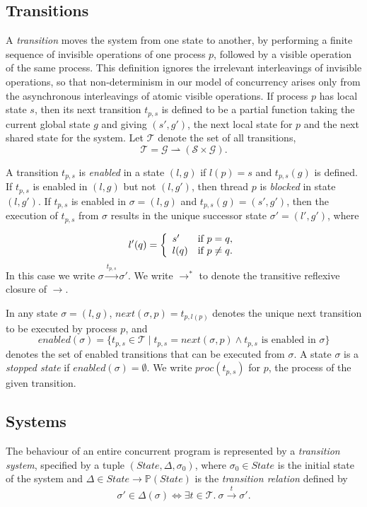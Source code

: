 \documentclass[12pt,a4paper,twoside,openany]{report}
\begin{document}
\subsection{Transitions}
\label{sec:trans-prep}
A \emph{transition} moves the system from one state to another,
by performing a finite sequence of invisible operations of one
process $p$, followed by a visible operation of the same
process. This definition ignores the irrelevant
interleavings of invisible operations, so that
non-determinism in our model of concurrency
arises only from the asynchronous interleavings of
atomic visible operations.
If process $p$ has local state $s$, then its next transition $t_{p,s}$
is defined to be a partial function taking the current
global state $g$ and giving $(s', g')$, the next local state for $p$
and the next shared state for the system. Let $\mathcal{T}$ denote the
set of all transitions,
	\[\mathcal{T} = \mathcal{G} \rightharpoonup
				(\mathcal{S} \times \mathcal{G}).\]

A transition $t_{p,s}$ is \emph{enabled} in a state
$(l, g)$ if $l(p) = s$ and $t_{p,s}(g)$ is defined.
If $t_{p,s}$ is enabled in $(l, g)$ but not $(l, g')$,
then thread $p$ is \emph{blocked} in
state $(l, g')$.
If $t_{p,s}$ is enabled in $\sigma = (l, g)$ and 
$t_{p,s}(g) = (s', g')$, then the
execution of $t_{p,s}$ from $\sigma$ results in the unique successor
state $\sigma' = (l', g')$, where

\[
	l'(q) = \left\{\begin{array}{lr}
				s' & \textmd{if } p = q, \\
				l(q) &\textmd{if } p \neq q.
			\end{array} \right.
\]
In this case we write $\sigma \xrightarrow{t_{p,s}} \sigma'$.
We write $\longrightarrow^*$ to denote the transitive reflexive
closure of $\longrightarrow$.

In any state $\sigma = (l, g)$,
$\textit{next}(\sigma, p) = t_{p,l(p)}$ denotes the unique next transition
to be executed by process $p$, and
\[
	\textit{enabled}(\sigma) = \{t_{p,s} \in \mathcal{T} \mid
	t_{p,s} = \textit{next}(\sigma, p)
	\wedge t_{p,s} \text{ is enabled in } \sigma\}
\]
denotes the set of enabled transitions that can be executed from $\sigma$.
A state $\sigma$ is a \emph{stopped state} if
$\textit{enabled}(\sigma) = \emptyset$.
We write $\textit{proc}(t_{p,s})$ for $p$, the
process of the given transition.

\subsection{Systems}
The behaviour of an entire concurrent program is represented by a
\emph{transition system},
specified by a tuple $(\textit{State}, \Delta, \sigma_0)$,
where $\sigma_0 \in \textit{State}$ is the initial state of the system and
$\Delta \in State \to \mathbb{P}(State)$
is the \emph{transition relation} defined by
\[
	\sigma' \in \Delta(\sigma) \iff
	\exists t \in \mathcal{T}. \ \sigma \xrightarrow{t} \sigma'.
\]
\end{document}

